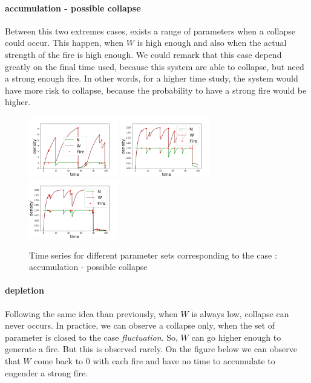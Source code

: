 \documentclass{article}
\begin{document}
\paragraph{accumulation - possible collapse \\} %
Between this two extremes cases, exists a range of parameters when a collapse could occur. This happen, when $W$ is high enough and also when the actual strength of the fire is high enough. We could remark that this case depend greatly on the final time used, because this system are able to collapse, but need a strong enough fire. In other words, for a higher time study, the system would have more risk to collapse, because the probability to have a strong fire would be higher.


\begin{figure}[h!]
\centering
\includegraphics[width=3.9cm]{return_between_1.png}
\includegraphics[width=3.9cm]{return_between_2.png}
\includegraphics[width=3.9cm]{return_between_3.png}
\caption{Time series for different parameter sets corresponding to the case : accumulation - possible collapse}
\end{figure}


\paragraph{depletion \\}
Following the same idea than previously, when $W$ is always low, collapse can never occurs. In practice, we can observe a collapse only, when the set of parameter is closed to the case \textit{fluctuation}. So, $W$ can go higher enough to generate a fire. But this is observed rarely. On the figure below we can observe that $W$ come back to $0$ with each fire and have no time to accumulate to engender a strong fire.
\end{document}
